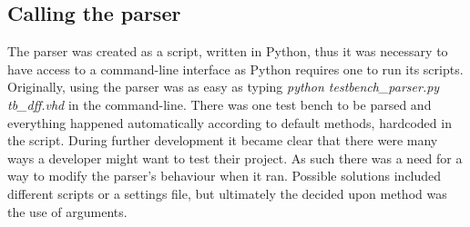 \documentclass[11pt,british]{article}
\begin{document}
\subsection{Calling the parser}
\label{subsec:parser}
The parser was created as a script, written in Python, thus it was necessary to have access to a command-line interface as Python requires one to run its scripts. Originally, using the parser was as easy as typing \emph{python testbench\_parser.py tb\_dff.vhd} in the command-line. There was one test bench to be parsed and everything happened automatically according to default methods, hardcoded in the script. During further development it became clear that there were many ways a developer might want to test their project. As such there was a need for a way to modify the parser's behaviour when it ran. Possible solutions included different scripts or a settings file, but ultimately the decided upon method was the use of arguments.
\end{document}
